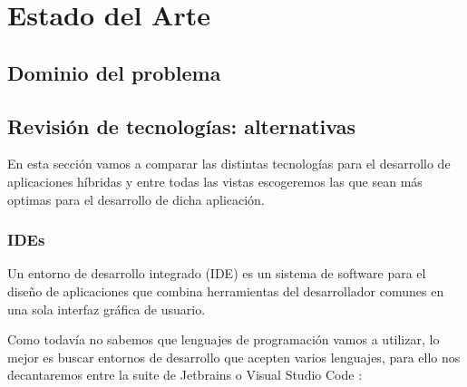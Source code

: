 \section{Estado del Arte}

\subsection{Dominio del problema}

\subsection{Revisión de tecnologías: alternativas}
En esta sección vamos a comparar las distintas tecnologías para el desarrollo de aplicaciones híbridas y entre todas las vistas escogeremos las que sean más optimas para el desarrollo de dicha aplicación.

\subsubsection{IDEs}
Un entorno de desarrollo integrado (IDE) \cite{ide} es un sistema de software para el diseño de aplicaciones que combina herramientas del desarrollador comunes en una sola interfaz gráfica de usuario.

Como todavía no sabemos que lenguajes de programación vamos a utilizar, lo mejor es buscar entornos de desarrollo que acepten varios lenguajes, para ello nos decantaremos entre la suite de Jetbrains \cite{jetbrains} o Visual Studio Code \cite{vscode}:


